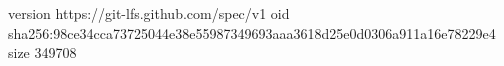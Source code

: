 version https://git-lfs.github.com/spec/v1
oid sha256:98ce34cca73725044e38e55987349693aaa3618d25e0d0306a911a16e78229e4
size 349708
